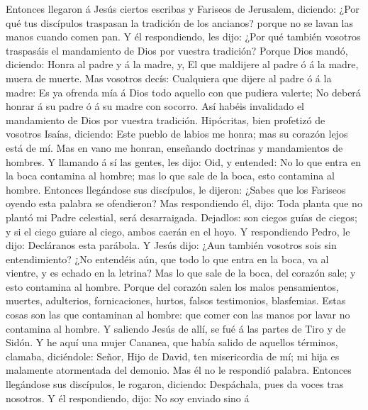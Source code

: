  Entonces llegaron á Jesús ciertos escribas y Fariseos de
Jerusalem, diciendo:  ¿Por qué tus discípulos traspasan la
tradición de los ancianos? porque no se lavan las manos cuando comen
pan.  Y él respondiendo, les dijo: ¿Por qué también
vosotros traspasáis el mandamiento de Dios por vuestra tradición?
 Porque Dios mandó, diciendo: Honra al padre y á la madre,
y, El que maldijere al padre ó á la madre, muera de muerte.
 Mas vosotros decís: Cualquiera que dijere al padre ó á la
madre: Es ya ofrenda mía á Dios todo aquello con que pudiera valerte;
 No deberá honrar á su padre ó á su madre con socorro. Así
habéis invalidado el mandamiento de Dios por vuestra tradición.
 Hipócritas, bien profetizó de vosotros Isaías, diciendo:
 Este pueblo de labios me honra; mas su corazón lejos está
de mí.  Mas en vano me honran, enseñando doctrinas y
mandamientos de hombres.  Y llamando á sí las gentes, les
dijo: Oid, y entended:  No lo que entra en la boca
contamina al hombre; mas lo que sale de la boca, esto contamina al
hombre.  Entonces llegándose sus discípulos, le dijeron:
¿Sabes que los Fariseos oyendo esta palabra se ofendieron?
 Mas respondiendo él, dijo: Toda planta que no plantó mi
Padre celestial, será desarraigada.  Dejadlos: son ciegos
guías de ciegos; y si el ciego guiare al ciego, ambos caerán en el hoyo.
 Y respondiendo Pedro, le dijo: Decláranos esta parábola.
 Y Jesús dijo: ¿Aun también vosotros sois sin
entendimiento?  ¿No entendéis aún, que todo lo que entra
en la boca, va al vientre, y es echado en la letrina? 
Mas lo que sale de la boca, del corazón sale; y esto contamina al
hombre.  Porque del corazón salen los malos pensamientos,
muertes, adulterios, fornicaciones, hurtos, falsos testimonios,
blasfemias.  Estas cosas son las que contaminan al
hombre: que comer con las manos por lavar no contamina al hombre.
 Y saliendo Jesús de allí, se fué á las partes de Tiro y
de Sidón.  Y he aquí una mujer Cananea, que había salido
de aquellos términos, clamaba, diciéndole: Señor, Hijo de David, ten
misericordia de mí; mi hija es malamente atormentada del demonio.
 Mas él no le respondió palabra. Entonces llegándose sus
discípulos, le rogaron, diciendo: Despáchala, pues da voces tras
nosotros.  Y él respondiendo, dijo: No soy enviado sino á
